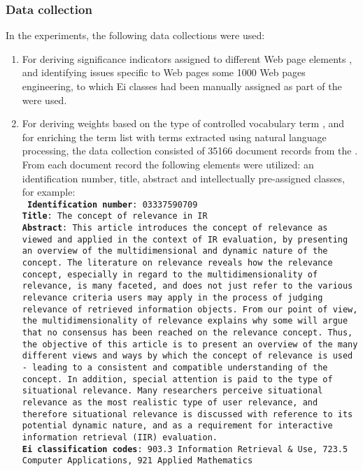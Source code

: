 \subsubsection{Data collection}
In the experiments, the following data collections were used:
\begin{enumerate}
\item For deriving significance indicators assigned to different Web page elements \cite{ardo05:_ECDL}, and identifying issues specific to Web pages \cite{GolubChall} some 1000 Web pages engineering, to which Ei classes had been manually assigned as part of the  were used.
\item For deriving weights based on the type of controlled vocabulary term \cite{GolubRole},
and for enriching the term list with terms extracted using natural language processing,
the data collection consisted of 35166 document records from the . From each document record the following elements were utilized: an identification number, title, abstract and intellectually pre-assigned classes, for example:\\[2mm]
{\small\tt
{\bf Identification number}:  03337590709\\
{\bf Title}:  The concept of relevance in IR\\
{\bf Abstract}:  This article introduces the concept of relevance as viewed and applied in the context of IR evaluation, by presenting an overview of the multidimensional and dynamic nature of the concept. The literature on relevance reveals how the relevance concept, especially in regard to the multidimensionality of relevance, is many faceted, and does not just refer to the various relevance criteria users may apply in the process of judging relevance of retrieved information objects. From our point of view, the multidimensionality of relevance explains why some will argue that no consensus has been reached on the relevance concept. Thus, the objective of this article is to present an overview of the many different views and ways by which the concept of relevance is used - leading to a consistent and compatible understanding of the concept. In addition, special attention is paid to the type of situational relevance. Many researchers perceive situational relevance as the most realistic type of user relevance, and therefore situational relevance is discussed with reference to its potential dynamic nature, and as a requirement for interactive information retrieval (IIR) evaluation.\\
{\bf Ei classification codes}:  903.3 Information Retrieval \& Use, 723.5 Computer Applications, 921 Applied Mathematics
}


\end{enumerate}
